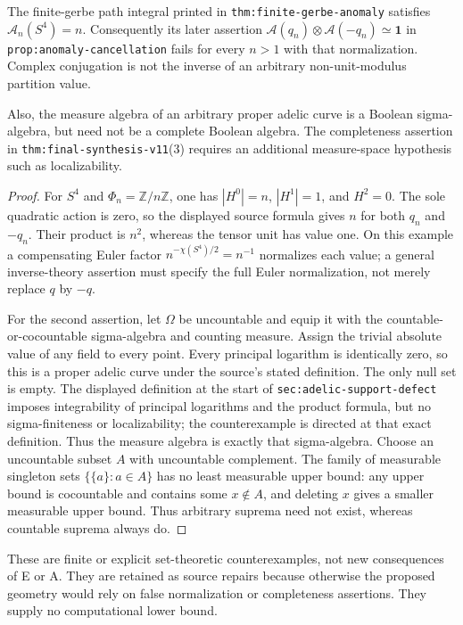 \begin{proposition}
The finite-gerbe path integral printed in
\texttt{thm:finite-gerbe-anomaly} satisfies
$\mathcal A_n(S^4)=n$. Consequently its later assertion
$\mathcal A(q_n)\otimes\mathcal A(-q_n)\simeq\mathbf1$
in \texttt{prop:anomaly-cancellation} fails for every $n>1$ with
that normalization. Complex conjugation is not the inverse of an
arbitrary non-unit-modulus partition value.

Also, the measure algebra of an arbitrary proper adelic curve is a
Boolean sigma-algebra, but need not be a complete Boolean algebra.
The completeness assertion in \texttt{thm:final-synthesis-v11}(3)
requires an additional measure-space hypothesis such as localizability.
\end{proposition}
\begin{proof}
For $S^4$ and $\Phi_n=\mathbb Z/n\mathbb Z$, one has
$|H^0|=n$, $|H^1|=1$, and $H^2=0$. The sole quadratic action is zero,
so the displayed source formula gives $n$ for both $q_n$ and $-q_n$.
Their product is $n^2$, whereas the tensor unit has value one. On this
example a compensating Euler factor $n^{-\chi(S^4)/2}=n^{-1}$
normalizes each value; a general inverse-theory assertion must specify
the full Euler normalization, not merely replace $q$ by $-q$.

For the second assertion, let $\Omega$ be uncountable and equip it
with the countable-or-cocountable sigma-algebra and counting measure.
Assign the trivial absolute value of any field to every point.
Every principal logarithm is identically zero, so this is a proper
adelic curve under the source's stated definition. The only null set
is empty. The displayed definition at the start of
\texttt{sec:adelic-support-defect} imposes integrability of principal
logarithms and the product formula, but no sigma-finiteness or
localizability; the counterexample is directed at that exact definition.
Thus the measure algebra
is exactly that sigma-algebra.
Choose an uncountable subset $A$ with uncountable complement. The
family of measurable singleton sets $\{\{a\}:a\in A\}$ has no
least measurable upper bound: any upper bound is cocountable and
contains some $x\notin A$, and deleting $x$ gives a smaller measurable
upper bound. Thus arbitrary suprema need not exist, whereas countable
suprema always do.
\end{proof}

These are finite or explicit set-theoretic counterexamples, not new
consequences of E or A. They are retained as source repairs because
otherwise the proposed geometry would rely on false normalization or
completeness assertions. They supply no computational lower bound.
